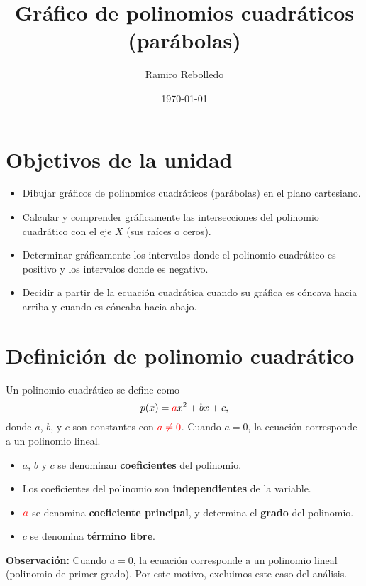 \documentclass{article}
\begin{document}
\title{Gr\'afico de polinomios cuadr\'aticos (par\'abolas)}
\author{Ramiro Rebolledo}
\date{\today}
\maketitle

\section{Objetivos de la unidad}
\begin{itemize}
\item Dibujar gr\'aficos de polinomios cuadr\'aticos (par\'abolas)
  en el plano cartesiano.
\item Calcular y comprender gr\'aficamente las intersecciones del polinomio
  cuadr\'atico con el eje $X$ (sus ra\'ices o ceros).
\item Determinar gr\'aficamente los intervalos donde el polinomio
  cuadr\'atico es positivo y los intervalos donde es negativo.
\item Decidir a partir de la ecuaci\'on cuadr\'atica cuando su gr\'afica es
  c\'oncava hacia arriba y cuando es c\'oncaba hacia abajo.
\end{itemize}

\section{Definici\'on de polinomio cuadr\'atico}
Un polinomio cuadr\'atico se define como
\[
  p(x) = \textcolor{red}{a}x^2 + bx + c,
\]
donde $a$, $b$, y $c$ son constantes con $\textcolor{red}{a \neq 0}$. 
Cuando $a = 0$, la ecuaci\'on corresponde a un polinomio lineal.

\begin{itemize}
\item $a$, $b$ y $c$ se denominan \textbf{coeficientes} del polinomio.
\item Los coeficientes del polinomio son \textbf{independientes}
  de la variable.
\item $\textcolor{red}{a}$ se denomina \textbf{coeficiente principal},
  y determina el \textbf{grado} del polinomio.
\item $c$ se denomina \textbf{t\'ermino libre}.
\end{itemize}

\noindent
\textbf{Observaci\'on:}
Cuando $a=0$, la ecuaci\'on corresponde a un polinomio lineal
(polinomio de primer grado).
Por este motivo, excluimos este caso del an\'alisis.
\end{document}
